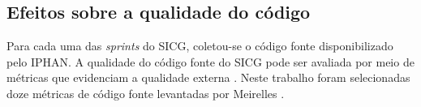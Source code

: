 \begin{figure}[h]
\end{figure}



\subsection[Efeitos sobre a qualidade do código]{Efeitos sobre a qualidade do código}

Para cada uma das \textit{sprints} do SICG, coletou-se o código fonte disponibilizado pelo IPHAN. A qualidade do código fonte do SICG pode ser avaliada por meio de métricas que evidenciam a qualidade externa \cite{ISO25023}. Neste trabalho foram selecionadas doze métricas de código fonte levantadas  por Meirelles \cite{Meirelles2013}. 


